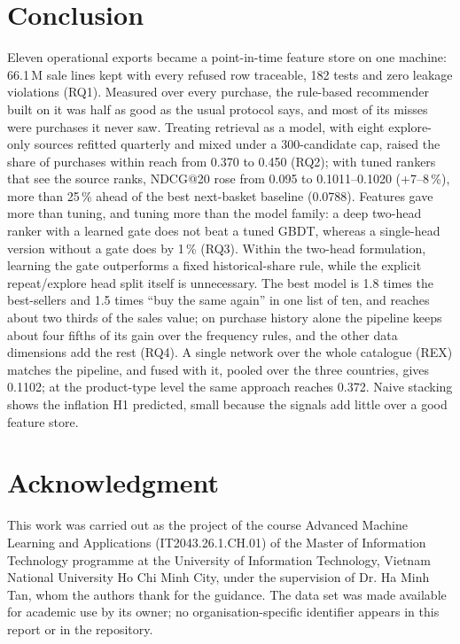\documentclass{ieeeaccess}
\makeatletter
\newcommand{\nRefUncond}{0.095}      %
\newcommand{\nCandOld}{0.370}        %
\newcommand{\nCandNew}{0.450}        %
\newcommand{\nBest}{0.1020}          %
\newcommand{\nTuned}{0.1011}         %
\newcommand{\nBaseline}{0.0788}      %
\makeatother
\begin{document}
\section{Conclusion}
\label{sec:conclusion}

Eleven operational exports became a point-in-time feature store on one machine: 66.1\,M sale lines kept with every refused row
traceable, 182 tests and zero leakage violations (RQ1). Measured over every purchase, the rule-based recommender built on it was half
as good as the usual protocol says, and most of its misses were purchases it never saw. Treating retrieval as a model, with eight explore-only sources refitted quarterly and mixed under a 300-candidate cap, raised the
share of purchases within reach from \nCandOld{} to \nCandNew{} (RQ2); with tuned rankers that see the source ranks, NDCG@20 rose from
\nRefUncond{} to \nTuned{}--\nBest{} (+7--8\,\%), more than 25\,\% ahead of the best next-basket baseline (\nBaseline{}). Features
gave more than tuning, and tuning more than the model family: a deep two-head ranker with a learned gate does not beat a tuned GBDT,
whereas a single-head version without a gate does by 1\,\% (RQ3). Within the two-head formulation, learning the gate outperforms a fixed historical-share rule, while the explicit repeat/explore head split itself is unnecessary. The best model is 1.8 times the best-sellers and 1.5 times ``buy the same again'' in one list of ten, and reaches
about two thirds of the sales value; on purchase history alone the pipeline keeps about four fifths of its gain over the frequency
rules, and the other data dimensions add the rest (RQ4). A single network over the whole catalogue (REX) matches the pipeline,
and fused with it, pooled over the three countries, gives 0.1102; at the product-type level the same approach reaches 0.372. Naive stacking shows the inflation H1 predicted, small because the signals add little over a good feature store.

\section*{Acknowledgment}
This work was carried out as the project of the course Advanced Machine Learning and Applications (IT2043.26.1.CH.01) of the
Master of Information Technology programme at the University of Information Technology, Vietnam National University Ho Chi Minh City,
under the supervision of Dr. Ha Minh Tan, whom the authors thank for the guidance. The data set was made available for academic use by its owner; no organisation-specific
identifier appears in this report or in the repository.



\EOD
\end{document}

